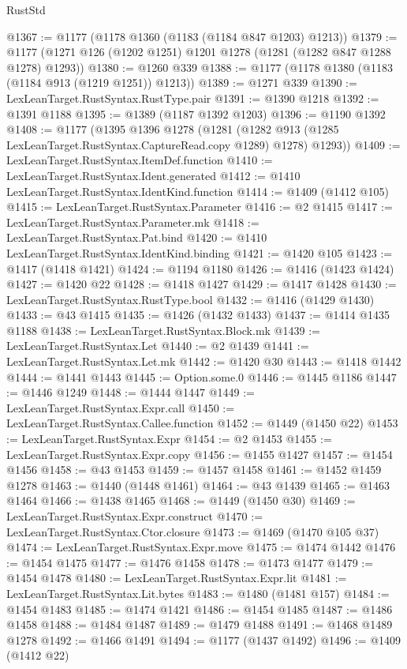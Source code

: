 \begin{lexlean}{RustStd}
\begin{coremodule}
{\begin{coremodule}
{{{{{{{{{{{{{{{{{{{{{{{{{{{{{{{@1367 := @1177 (@1178 @1360 (@1183 (@1184 @847 @1203) @1213))
@1379 := @1177 (@1271 @126 (@1202 @1251) @1201 @1278 (@1281 (@1282 @847 @1288 @1278) @1293))
@1380 := @1260 @339
@1388 := @1177 (@1178 @1380 (@1183 (@1184 @913 (@1219 @1251)) @1213))
@1389 := @1271 @339
@1390 := LexLeanTarget.RustSyntax.RustType.pair
@1391 := @1390 @1218
@1392 := @1391 @1188
@1395 := @1389 (@1187 @1392 @1203)
@1396 := @1190 @1392
@1408 := @1177
    (@1395
      @1396
      @1278
      (@1281 (@1282 @913 (@1285 LexLeanTarget.RustSyntax.CaptureRead.copy @1289) @1278) @1293))
@1409 := LexLeanTarget.RustSyntax.ItemDef.function
@1410 := LexLeanTarget.RustSyntax.Ident.generated
@1412 := @1410 LexLeanTarget.RustSyntax.IdentKind.function
@1414 := @1409 (@1412 @105)
@1415 := LexLeanTarget.RustSyntax.Parameter
@1416 := @2 @1415
@1417 := LexLeanTarget.RustSyntax.Parameter.mk
@1418 := LexLeanTarget.RustSyntax.Pat.bind
@1420 := @1410 LexLeanTarget.RustSyntax.IdentKind.binding
@1421 := @1420 @105
@1423 := @1417 (@1418 @1421)
@1424 := @1194 @1180
@1426 := @1416 (@1423 @1424)
@1427 := @1420 @22
@1428 := @1418 @1427
@1429 := @1417 @1428
@1430 := LexLeanTarget.RustSyntax.RustType.bool
@1432 := @1416 (@1429 @1430)
@1433 := @43 @1415
@1435 := @1426 (@1432 @1433)
@1437 := @1414 @1435 @1188
@1438 := LexLeanTarget.RustSyntax.Block.mk
@1439 := LexLeanTarget.RustSyntax.Let
@1440 := @2 @1439
@1441 := LexLeanTarget.RustSyntax.Let.mk
@1442 := @1420 @30
@1443 := @1418 @1442
@1444 := @1441 @1443
@1445 := Option.some.{0}
@1446 := @1445 @1186
@1447 := @1446 @1249
@1448 := @1444 @1447
@1449 := LexLeanTarget.RustSyntax.Expr.call
@1450 := LexLeanTarget.RustSyntax.Callee.function
@1452 := @1449 (@1450 @22)
@1453 := LexLeanTarget.RustSyntax.Expr
@1454 := @2 @1453
@1455 := LexLeanTarget.RustSyntax.Expr.copy
@1456 := @1455 @1427
@1457 := @1454 @1456
@1458 := @43 @1453
@1459 := @1457 @1458
@1461 := @1452 @1459 @1278
@1463 := @1440 (@1448 @1461)
@1464 := @43 @1439
@1465 := @1463 @1464
@1466 := @1438 @1465
@1468 := @1449 (@1450 @30)
@1469 := LexLeanTarget.RustSyntax.Expr.construct
@1470 := LexLeanTarget.RustSyntax.Ctor.closure
@1473 := @1469 (@1470 @105 @37)
@1474 := LexLeanTarget.RustSyntax.Expr.move
@1475 := @1474 @1442
@1476 := @1454 @1475
@1477 := @1476 @1458
@1478 := @1473 @1477
@1479 := @1454 @1478
@1480 := LexLeanTarget.RustSyntax.Expr.lit
@1481 := LexLeanTarget.RustSyntax.Lit.bytes
@1483 := @1480 (@1481 @157)
@1484 := @1454 @1483
@1485 := @1474 @1421
@1486 := @1454 @1485
@1487 := @1486 @1458
@1488 := @1484 @1487
@1489 := @1479 @1488
@1491 := @1468 @1489 @1278
@1492 := @1466 @1491
@1494 := @1177 (@1437 @1492)
@1496 := @1409 (@1412 @22)
}}}}}}}}}}}}}}}}}}}}}}}}}}}}}}}
\end{coremodule}}
\end{coremodule}
\end{lexlean}
